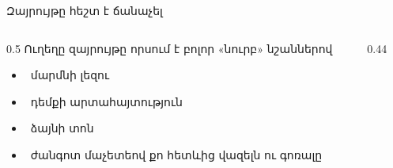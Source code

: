 \begin{frame}{Զայրույթը հեշտ է ճանաչել}
  \begin{columns}[c]
    \begin{column}{0.5\textwidth}
      {\small Ուղեղը զայրույթը որսում է բոլոր «նուրբ» նշաններով}\par\medskip
      \begin{itemize}
        \item {}\ մարմնի լեզու
        \item {}\ դեմքի արտահայտություն
        \item {}\ ձայնի տոն
        \item<2-> \ ժանգոտ մաչետեով քո հետևից վազելն ու գոռալը
      \end{itemize}
    \end{column}
    \begin{column}{0.44\textwidth}
    \end{column}
  \end{columns}
\end{frame}

